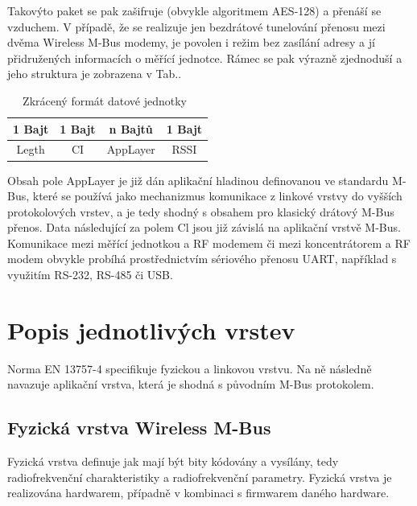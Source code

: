 Takovýto paket se pak zašifruje (obvykle algoritmem AES-128) a přenáší se vzduchem. V případě, že se realizuje jen bezdrátové tunelování přenosu mezi dvěma Wireless M-Bus modemy, je povolen i režim bez zasílání adresy a jí přidružených informacích o měřící jednotce. Rámec se pak výrazně zjednoduší a jeho struktura je zobrazena v Tab.\cite{PaketWm3}.

			
			\begin{table}[!h]
\centering
\begin{tabular}{cccc}
1 Bajt & 1 Bajt & n Bajtů & 1 Bajt \\ \hline
\multicolumn{1}{|c|}{Legth} & \multicolumn{1}{c|}{CI} & \multicolumn{1}{c|}{AppLayer} & \multicolumn{1}{c|}{RSSI} \\ \hline
\end{tabular}
\caption{Zkrácený formát datové jednotky~\cite{FormatDatoveJednotky}}
\label{PaketWm3}
\end{table}
			
Obsah pole AppLayer je již dán aplikační hladinou definovanou ve standardu M-Bus, které se používá jako mechanizmus komunikace z linkové vrstvy do vyšších protokolových vrstev, a je tedy shodný s obsahem pro klasický drátový M-Bus přenos.  Data následující za polem Cl jsou již závislá na aplikační vrstvě M-Bus. Komunikace mezi měřící jednotkou a RF modemem či mezi koncentrátorem a RF modem obvykle probíhá prostřednictvím sériového přenosu UART, například s využitím RS-232, RS-485 či USB.




\newpage


\section{Popis jednotlivých vrstev}

Norma EN 13757-4 specifikuje fyzickou a linkovou vrstvu. Na ně následně navazuje aplikační vrstva, která je shodná s původním M-Bus protokolem.

\subsection{Fyzická vrstva Wireless M-Bus}
Fyzická vrstva definuje jak mají být bity kódovány a vysílány, tedy radiofrekvenční charakteristiky a radiofrekvenční parametry. Fyzická vrstva je realizována hardwarem, případně v kombinaci s firmwarem daného hardware.

